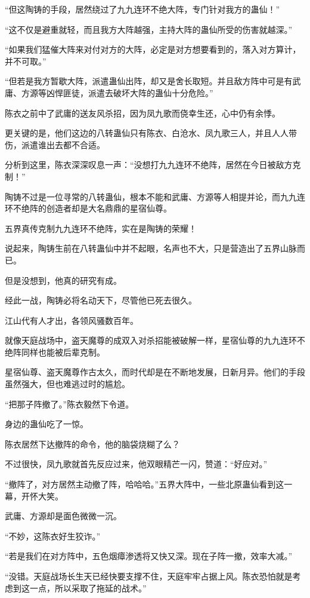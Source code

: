 \begin{this_body}
“但这陶铸的手段，居然绕过了九九连环不绝大阵，专门针对我方的蛊仙！”

“这不仅是避重就轻，而且我方大阵越强，主持大阵的蛊仙所受的伤害就越深。”

“如果我们猛催大阵来对付对方的大阵，必定是对方想要看到的，落入对方算计，并不可取。”

“但若是我方暂歇大阵，派遣蛊仙出阵，却又是舍长取短。并且敌方阵中可是有武庸、方源等凶悍匪徒，派遣去破坏大阵的蛊仙十分危险。”

陈衣之前中了武庸的送友风杀招，因为凤九歌而侥幸生还，心中仍有余悸。

更关键的是，他们这边的八转蛊仙只有陈衣、白沧水、凤九歌三人，并且人人带伤，派遣谁出去都不合适。

分析到这里，陈衣深深叹息一声：“没想打九九连环不绝阵，居然在今日被敌方克制！”

陶铸不过是一位寻常的八转蛊仙，根本不能和武庸、方源等人相提并论，而九九连环不绝阵的创造者却是大名鼎鼎的星宿仙尊。

五界真传克制九九连环不绝阵，实在是陶铸的荣耀！

说起来，陶铸生前在八转蛊仙中并不起眼，名声也不大，只是营造出了五界山脉而已。

但是没想到，他真的研究有成。

经此一战，陶铸必将名动天下，尽管他已死去很久。

江山代有人才出，各领风骚数百年。

就像天庭战场中，盗天魔尊的成双入对杀招能被破解一样，星宿仙尊的九九连环不绝阵同样也能被后辈克制。

星宿仙尊、盗天魔尊作古太久，而时代却是在不断地发展，日新月异。他们的手段虽然强大，但也难逃过时的尴尬。

“把那子阵撤了。”陈衣毅然下令道。

身边的蛊仙吃了一惊。

陈衣居然下达撤阵的命令，他的脑袋烧糊了么？

不过很快，凤九歌就首先反应过来，他双眼精芒一闪，赞道：“好应对。”

“撤阵了，对方居然主动撤了阵，哈哈哈。”五界大阵中，一些北原蛊仙看到这一幕，开怀大笑。

武庸、方源却是面色微微一沉。

“不妙，这陈衣好生狡诈。”

“若是我们在对方阵中，五色烟瘴渗透将又快又深。现在子阵一撤，效率大减。”

“没错。天庭战场长生天已经快要支撑不住，天庭牢牢占据上风。陈衣恐怕就是考虑到这一点，所以采取了拖延的战术。”


\end{this_body}
